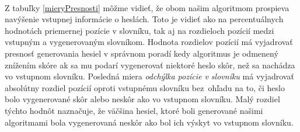 \paragraph{}
Z tabuľky \ref{mieryPresnosti} môžme vidieť, že obom našim algoritmom prospieva navýšenie vstupnej informácie o heslách. Toto je vidieť ako na percentuálnych hodnotách priemernej pozície v slovníku, tak aj na rozdieloch pozícií medzi vstupným a vygenerovaným slovníkom. Hodnota rozdielov pozícií má vyjadrovať presnosť generovania hesiel v správnom poradí kedy algoritmus je odmenený znížením skóre ak sa mu podarí vygenerovať niektoré heslo skôr, než sa nachádza vo vstupnom slovníku. Posledná miera \emph{odchýlka pozície v slovníku} má vyjadrovať absolútny rozdiel pozícií oproti vstupnému slovníku bez~ohľadu na to, či heslo bolo vygenerované skôr alebo neskôr ako vo vstupnom slovníku. Malý rozdiel týchto hodnôt naznačuje, že väčšina hesiel, ktoré boli generované našimi algoritmami bola vygenerovaná neskôr ako bol ich výskyt vo vstupnom slovníku.